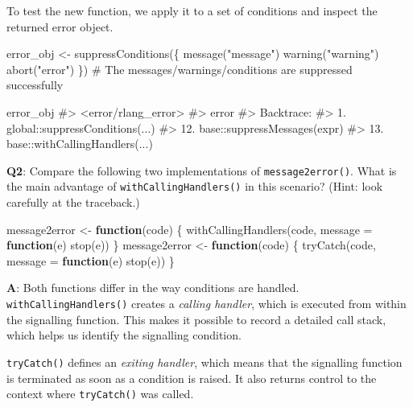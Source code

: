 \documentclass[
]{krantz}
\makeatletter
\newenvironment{Shaded}{\begin{snugshade}}{\end{snugshade}}
\newcommand{\CommentTok}[1]{\textcolor[rgb]{0.56,0.35,0.01}{\textit{#1}}}
\newcommand{\ControlFlowTok}[1]{\textcolor[rgb]{0.13,0.29,0.53}{\textbf{#1}}}
\newcommand{\DataTypeTok}[1]{\textcolor[rgb]{0.13,0.29,0.53}{#1}}
\newcommand{\KeywordTok}[1]{\textcolor[rgb]{0.13,0.29,0.53}{\textbf{#1}}}
\newcommand{\NormalTok}[1]{#1}
\newcommand{\StringTok}[1]{\textcolor[rgb]{0.31,0.60,0.02}{#1}}
\newenvironment{kframe}{%
\medskip{}
\setlength{\fboxsep}{.8em}
 \def\at@end@of@kframe{}%
 \ifinner\ifhmode%
  \def\at@end@of@kframe{\end{minipage}}%
  \begin{minipage}{\columnwidth}%
 \fi\fi%
 \def\FrameCommand##1{\hskip\@totalleftmargin \hskip-\fboxsep
 \colorbox{shadecolor}{##1}\hskip-\fboxsep
     \hskip-\linewidth \hskip-\@totalleftmargin \hskip\columnwidth}%
 \MakeFramed {\advance\hsize-\width
   \@totalleftmargin\z@ \linewidth\hsize
   \@setminipage}}%
 {\par\unskip\endMakeFramed%
 \at@end@of@kframe}
\renewenvironment{Shaded}{\begin{kframe}}{\end{kframe}}
\renewcommand{\KeywordTok} [1]{\textcolor[rgb]{0.00,0.44,0.13}{{#1}}}
\renewcommand{\DataTypeTok}[1]{\textcolor[rgb]{0.56,0.13,0.00}{{#1}}}
\renewcommand{\StringTok}  [1]{\textcolor[rgb]{0.25,0.44,0.63}{{#1}}}
\renewcommand{\CommentTok} [1]{\textcolor[rgb]{0.38,0.63,0.69}{{#1}}}
\renewcommand{\NormalTok}  [1]{{#1}}
\makeatother
\begin{document}
To test the new function, we apply it to a set of conditions and inspect the returned error object.

\begin{Shaded}
\begin{Highlighting}[]
\NormalTok{error_obj <-}\StringTok{ }\KeywordTok{suppressConditions}\NormalTok{(\{}
  \KeywordTok{message}\NormalTok{(}\StringTok{"message"}\NormalTok{)}
  \KeywordTok{warning}\NormalTok{(}\StringTok{"warning"}\NormalTok{)}
  \KeywordTok{abort}\NormalTok{(}\StringTok{"error"}\NormalTok{)}
\NormalTok{\})}
\CommentTok{# The messages/warnings/conditions are suppressed successfully}

\NormalTok{error_obj}
\CommentTok{#> <error/rlang_error>}
\CommentTok{#> error}
\CommentTok{#> Backtrace:}
\CommentTok{#>   1. global::suppressConditions(...)}
\CommentTok{#>  12. base::suppressMessages(expr)}
\CommentTok{#>  13. base::withCallingHandlers(...)}
\end{Highlighting}
\end{Shaded}

\textbf{{Q2}}: Compare the following two implementations of \texttt{message2error()}. What is the main advantage of \texttt{withCallingHandlers()} in this scenario? (Hint: look carefully at the traceback.)

\begin{Shaded}
\begin{Highlighting}[]
\NormalTok{message2error <-}\StringTok{ }\ControlFlowTok{function}\NormalTok{(code) \{}
  \KeywordTok{withCallingHandlers}\NormalTok{(code, }\DataTypeTok{message =} \ControlFlowTok{function}\NormalTok{(e) }\KeywordTok{stop}\NormalTok{(e))}
\NormalTok{\}}
\NormalTok{message2error <-}\StringTok{ }\ControlFlowTok{function}\NormalTok{(code) \{}
  \KeywordTok{tryCatch}\NormalTok{(code, }\DataTypeTok{message =} \ControlFlowTok{function}\NormalTok{(e) }\KeywordTok{stop}\NormalTok{(e))}
\NormalTok{\}}
\end{Highlighting}
\end{Shaded}

\textbf{{A}}: Both functions differ in the way conditions are handled. \texttt{withCallingHandlers()} creates a \emph{calling handler}, which is executed from within the signalling function. This makes it possible to record a detailed call stack, which helps us identify the signalling condition.

\texttt{tryCatch()} defines an \emph{exiting handler}, which means that the signalling function is terminated as soon as a condition is raised. It also returns control to the context where \texttt{tryCatch()} was called.
\end{document}

